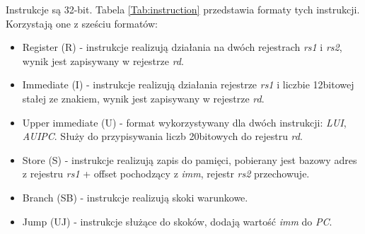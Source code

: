 \documentclass[11pt,a4paper]{article}
\begin{document}
				Instrukcje są 32-bit. Tabela \ref{Tab:instruction} przedstawia formaty tych instrukcji. Korzystają one z sześciu formatów:
		\begin{itemize}
			\item Register (R) - instrukcje realizują działania na dwóch rejestrach {\it rs1} i {\it rs2}, wynik jest zapisywany w rejestrze {\it rd}.
			\item Immediate (I) - instrukcje realizują działania rejestrze {\it rs1} i liczbie 12bitowej stałej ze znakiem, wynik jest zapisywany w rejestrze {\it rd}.
			\item Upper immediate (U) - format wykorzystywany dla dwóch instrukcji: {\it LUI}, {\it AUIPC}. Służy do przypisywania liczb 20bitowych do rejestru {\it rd}.
			\item Store (S) - instrukcje realizują zapis do pamięci, pobierany jest bazowy adres z rejestru {\it rs1} + offset pochodzący z {\it imm}, rejestr {\it rs2} przechowuje.
			\item Branch (SB) - instrukcje realizują skoki warunkowe.
			\item Jump (UJ) - instrukcje służące do skoków, dodają wartość {\it imm} do {\it PC}.
		\end{itemize}
\end{document}
